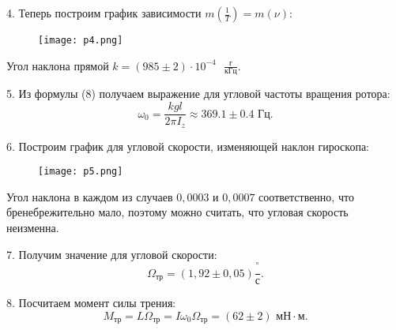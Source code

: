 4. Теперь построим график зависимости
$m\left(\frac 1T\right) = m\left(\nu\right)$:
\begin{figure}[H]
    \centering
\texttt{[image: p4.png]}
    \label{fig:my_label}
\end{figure}
Угол наклона прямой $k = (985 \pm 2) \cdot 10^{-4}\text{ }\frac{\text{г}}{\text{кГц}}$.

5. Из формулы (8) получаем выражение для угловой частоты вращения
ротора:
\begin{equation*}
    \omega_0 = \frac{kgl}{2\pi I_z} \approx 369.1 \pm 0.4 \text{ Гц}.
\end{equation*}

6. Построим график для угловой скорости, изменяющей наклон
гироскопа:

\begin{figure}[H]
    \centering
\texttt{[image: p5.png]}
    \label{fig:my_label}
\end{figure}
Угол наклона в каждом из случаев $0,0003$ и $0,0007$ соответственно,
что бренебрежительно мало, поэтому можно считать, что угловая
скорость неизменна.

7. Получим значение для угловой скорости:
\begin{equation*}
    \Omega_\text{тр} = \left(1,92 \pm 0,05\right)  \frac{^\circ}{\text{с}}.
\end{equation*}

8. Посчитаем момент силы трения:
\begin{equation*}
    M_\text{тр} = L\Omega_\text{тр} = I\omega_0\Omega_\text{тр} = \left(62 \pm 2\right) \text{ мН} \cdot \text{м}.
\end{equation*}
